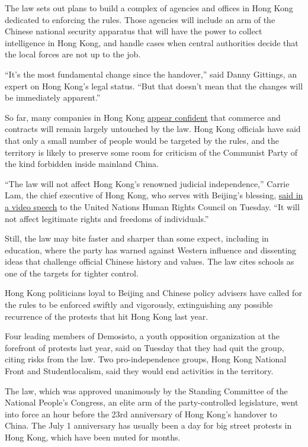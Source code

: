 The law sets out plans to build a complex of agencies and offices in
Hong Kong dedicated to enforcing the rules. Those agencies will include
an arm of the Chinese national security apparatus that will have the
power to collect intelligence in Hong Kong, and handle cases when
central authorities decide that the local forces are not up to the job.

``It's the most fundamental change since the handover,'' said Danny
Gittings, an expert on Hong Kong's legal status. ``But that doesn't mean
that the changes will be immediately apparent.''

So far, many companies in Hong Kong
\href{https://www.nytimes3xbfgragh.onion/2020/06/30/business/china-hong-kong-security-law-business.html}{appear
confident} that commerce and contracts will remain largely untouched by
the law. Hong Kong officials have said that only a small number of
people would be targeted by the rules, and the territory is likely to
preserve some room for criticism of the Communist Party of the kind
forbidden inside mainland China.

``The law will not affect Hong Kong's renowned judicial independence,''
Carrie Lam, the chief executive of Hong Kong, who serves with Beijing's
blessing,
\href{https://www.info.gov.hk/gia/general/202006/30/P2020063000655.htm}{said
in a video speech} to the United Nations Human Rights Council on
Tuesday. ``It will not affect legitimate rights and freedoms of
individuals.''

Still, the law may bite faster and sharper than some expect, including
in education, where the party has warned against Western influence and
dissenting ideas that challenge official Chinese history and values. The
law cites schools as one of the targets for tighter control.

Hong Kong politicians loyal to Beijing and Chinese policy advisers have
called for the rules to be enforced swiftly and vigorously,
extinguishing any possible recurrence of the protests that hit Hong Kong
last year.

Four leading members of Demosisto, a youth opposition organization at
the forefront of protests last year, said on Tuesday that they had quit
the group, citing risks from the law. Two pro-independence groups, Hong
Kong National Front and Studentlocalism, said they would end activities
in the territory.

The law, which was approved unanimously by the Standing Committee of the
National People's Congress, an elite arm of the party-controlled
legislature, went into force an hour before the 23rd anniversary of Hong
Kong's handover to China. The July 1 anniversary has usually been a day
for big street protests in Hong Kong, which have been muted for months.

